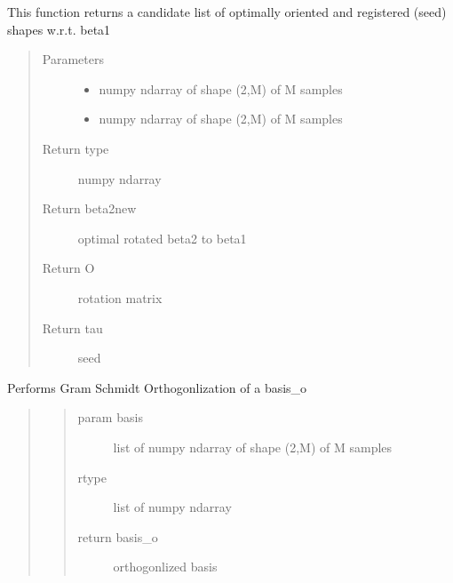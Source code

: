\documentclass[letterpaper,10pt,english]{sphinxmanual}
\begin{document}
\begin{fulllineitems}
\label{\detokenize{curve_functions:curve_functions.find_rotation_and_seed_q}}
This function returns a candidate list of optimally oriented and
registered (seed) shapes w.r.t. beta1
\begin{quote}\begin{description}
\item[{Parameters}] \leavevmode\begin{itemize}
\item {} 
 \textendash{} numpy ndarray of shape (2,M) of M samples

\item {} 
 \textendash{} numpy ndarray of shape (2,M) of M samples

\end{itemize}

\item[{Return type}] \leavevmode
numpy ndarray

\item[{Return beta2new}] \leavevmode
optimal rotated beta2 to beta1

\item[{Return O}] \leavevmode
rotation matrix

\item[{Return tau}] \leavevmode
seed

\end{description}\end{quote}

\end{fulllineitems}


\begin{fulllineitems}
\label{\detokenize{curve_functions:curve_functions.gram_schmidt}}
Performs Gram Schmidt Orthogonlization of a basis\_o
\begin{quote}
\begin{quote}\begin{description}
\item[{param basis}] \leavevmode
list of numpy ndarray of shape (2,M) of M samples

\item[{rtype}] \leavevmode
list of numpy ndarray

\item[{return basis\_o}] \leavevmode
orthogonlized basis

\end{description}\end{quote}
\end{quote}

\end{fulllineitems}
\end{document}
